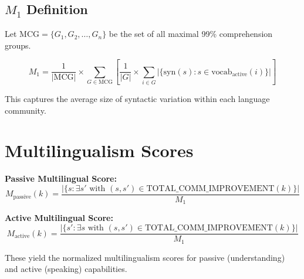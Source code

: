\documentclass[11pt,a4paper]{article}
\begin{document}
\subsection{$M_1$ Definition}
Let $\text{MCG} = \{G_1, G_2, \ldots, G_n\}$ be the set of all maximal 99\% comprehension groups.

\begin{equation}
M_1 = \frac{1}{|\text{MCG}|} \times \sum_{G \in \text{MCG}} \left[\frac{1}{|G|} \times \sum_{i \in G} |\{\text{syn}(s) : s \in \text{vocab}_\text{active}(i)\}|\right]
\end{equation}

This captures the average size of syntactic variation within each language community.

\section{Multilingualism Scores}

\noindent\textbf{Passive Multilingual Score:}
\begin{equation}
M_\text{passive}(k) = \frac{|\{s : \exists s' \text{ with } (s,s') \in \text{TOTAL\_COMM\_IMPROVEMENT}(k)\}|}{M_1}
\end{equation}

\noindent\textbf{Active Multilingual Score:}
\begin{equation}
M_\text{active}(k) = \frac{|\{s' : \exists s \text{ with } (s,s') \in \text{TOTAL\_COMM\_IMPROVEMENT}(k)\}|}{M_1}
\end{equation}

These yield the normalized multilingualism scores for passive (understanding) and active (speaking) capabilities.
\end{document}
